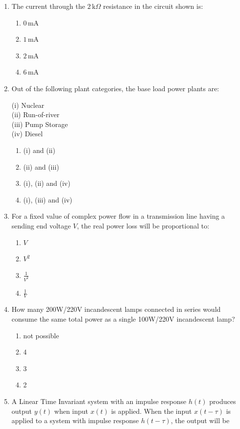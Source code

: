 \documentclass[article]{IEEEtran}
\numberwithin{figure}{enumi}
\begin{document}
\begin{enumerate}
\item The current through the $2 \, \text{k}\Omega$ resistance in the circuit shown is:

\begin{enumerate}
\item $0 \, \text{mA}$
\item $1 \, \text{mA}$
\item $2 \, \text{mA}$
\item $6 \, \text{mA}$
\end{enumerate}

\item Out of the following plant categories, the base load power plants are:

(i) Nuclear \\
(ii) Run-of-river \\
(iii) Pump Storage \\
(iv) Diesel \\

\begin{enumerate}
\item (i) and (ii)
\item (ii) and (iii)
\item (i), (ii) and (iv)
\item (i), (iii) and (iv)
\end{enumerate}

\item For a fixed value of complex power flow in a transmission line having a sending end voltage $V$, the real power loss will be proportional to:

\begin{enumerate}
\item $V$
\item $V^2$
\item $\frac{1}{V^2}$
\item $\frac{1}{V}$
\end{enumerate}

\item How many 200W/220V incandescent lamps connected in series would consume the same total power as a single 100W/220V incandescent lamp?

\begin{enumerate}
\item not possible
\item 4
\item 3
\item 2
\end{enumerate}

\item A Linear Time Invariant system with an impulse response $h(t)$ produces output $y(t)$ when input $x(t)$ is applied. When the input $x(t - \tau)$ is applied to a system with impulse response $h(t - \tau)$, the output will be


\end{enumerate}
\end{document}
